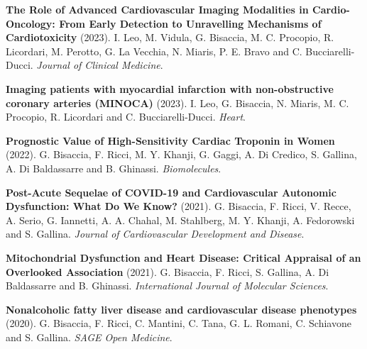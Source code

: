 \documentclass[
  letterpaper,
  DIV=11,
  numbers=noendperiod]{scrartcl}
\begin{document}
\textbf{The Role of Advanced Cardiovascular Imaging Modalities in
Cardio-Oncology: From Early Detection to Unravelling Mechanisms of
Cardiotoxicity} (2023). I. Leo, M. Vidula, G. Bisaccia, M. C. Procopio,
R. Licordari, M. Perotto, G. La Vecchia, N. Miaris, P. E. Bravo and C.
Bucciarelli-Ducci. \emph{Journal of Clinical Medicine}.
\href{https://doi.org/10.3390/jcm12154945}{}

\textbf{Imaging patients with myocardial infarction with non-obstructive
coronary arteries (MINOCA)} (2023). I. Leo, G. Bisaccia, N. Miaris, M.
C. Procopio, R. Licordari and C. Bucciarelli-Ducci. \emph{Heart}.
\href{https://doi.org/10.1136/heartjnl-2023-322835}{}

\textbf{Prognostic Value of High-Sensitivity Cardiac Troponin in Women}
(2022). G. Bisaccia, F. Ricci, M. Y. Khanji, G. Gaggi, A. Di Credico, S.
Gallina, A. Di Baldassarre and B. Ghinassi. \emph{Biomolecules}.
\href{https://doi.org/10.3390/biom12101496}{}

\textbf{Post-Acute Sequelae of COVID-19 and Cardiovascular Autonomic
Dysfunction: What Do We Know?} (2021). G. Bisaccia, F. Ricci, V. Recce,
A. Serio, G. Iannetti, A. A. Chahal, M. Stahlberg, M. Y. Khanji, A.
Fedorowski and S. Gallina. \emph{Journal of Cardiovascular Development
and Disease}. \href{https://doi.org/10.3390/jcdd8110156}{}

\textbf{Mitochondrial Dysfunction and Heart Disease: Critical Appraisal
of an Overlooked Association} (2021). G. Bisaccia, F. Ricci, S. Gallina,
A. Di Baldassarre and B. Ghinassi. \emph{International Journal of
Molecular Sciences}. \href{https://doi.org/10.3390/ijms22020614}{}

\textbf{Nonalcoholic fatty liver disease and cardiovascular disease
phenotypes} (2020). G. Bisaccia, F. Ricci, C. Mantini, C. Tana, G. L.
Romani, C. Schiavone and S. Gallina. \emph{SAGE Open Medicine}.
\href{https://doi.org/10.1177/2050312120933804}{}
\end{document}
